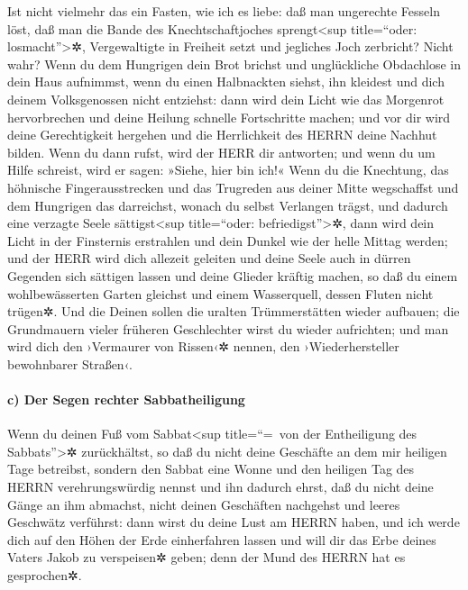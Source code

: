 Ist nicht vielmehr das ein Fasten, wie ich es liebe: daß
man ungerechte Fesseln löst, daß man die Bande des Knechtschaftjoches
sprengt\textless sup title=``oder: losmacht''\textgreater✲,
Vergewaltigte in Freiheit setzt und jegliches Joch zerbricht?
Nicht wahr? Wenn du dem Hungrigen dein Brot brichst und
unglückliche Obdachlose in dein Haus aufnimmst, wenn du einen
Halbnackten siehst, ihn kleidest und dich deinem Volksgenossen nicht
entziehst: dann wird dein Licht wie das Morgenrot
hervorbrechen und deine Heilung schnelle Fortschritte machen; und vor
dir wird deine Gerechtigkeit hergehen und die Herrlichkeit des HERRN
deine Nachhut bilden. Wenn du dann rufst, wird der HERR
dir antworten; und wenn du um Hilfe schreist, wird er sagen: »Siehe,
hier bin ich!« Wenn du die Knechtung, das höhnische Fingerausstrecken
und das Trugreden aus deiner Mitte wegschaffst und dem
Hungrigen das darreichst, wonach du selbst Verlangen trägst, und dadurch
eine verzagte Seele sättigst\textless sup title=``oder:
befriedigst''\textgreater✲, dann wird dein Licht in der Finsternis
erstrahlen und dein Dunkel wie der helle Mittag werden;
und der HERR wird dich allezeit geleiten und deine Seele
auch in dürren Gegenden sich sättigen lassen und deine Glieder kräftig
machen, so daß du einem wohlbewässerten Garten gleichst und einem
Wasserquell, dessen Fluten nicht trügen✲. Und die Deinen
sollen die uralten Trümmerstätten wieder aufbauen; die Grundmauern
vieler früheren Geschlechter wirst du wieder aufrichten; und man wird
dich den ›Vermaurer von Rissen‹✲ nennen, den ›Wiederhersteller
bewohnbarer Straßen‹.

\hypertarget{c-der-segen-rechter-sabbatheiligung}{%
\paragraph{c) Der Segen rechter
Sabbatheiligung}\label{c-der-segen-rechter-sabbatheiligung}}

Wenn du deinen Fuß vom Sabbat\textless sup title=``=~von
der Entheiligung des Sabbats''\textgreater✲ zurückhältst, so daß du
nicht deine Geschäfte an dem mir heiligen Tage betreibst, sondern den
Sabbat eine Wonne und den heiligen Tag des HERRN verehrungswürdig nennst
und ihn dadurch ehrst, daß du nicht deine Gänge an ihm abmachst, nicht
deinen Geschäften nachgehst und leeres Geschwätz verführst:
dann wirst du deine Lust am HERRN haben, und ich werde
dich auf den Höhen der Erde einherfahren lassen und will dir das Erbe
deines Vaters Jakob zu verspeisen✲ geben; denn der Mund des HERRN hat es
gesprochen✲.

